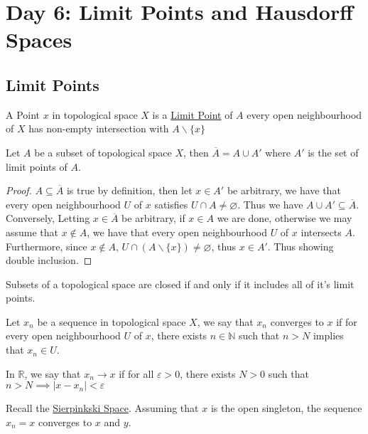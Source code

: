 \section{Day 6: Limit Points and Hausdorff Spaces}
\subsection{Limit Points}
\begin{definition}
    A Point $x$ in topological space $X$ is a \href{https://en.wikipedia.org/wiki/Accumulation_point}{Limit Point} of $A$ every open neighbourhood of $X$ has non-empty intersection with $A\backslash\{x\}$
\end{definition}
\begin{proposition}
    Let $A$ be a subset of topological space $X$, then $\overline{A} = A\cup A'$ where $A'$ is the set of limit points of $A$.
\end{proposition}
\begin{proof}
    $A\subseteq \overline{A}$ is true by definition, then let $x\in A'$ be arbitrary, we have that every open neighbourhood $U$ of $x$ satisfies $U\cap A\neq\varnothing$. Thus we have $A\cup A'\subseteq \overline{A}$. Conversely, Letting $x\in\overline{A}$ be arbitrary, if $x\in A$ we are done, otherwise we may assume that $x\not\in A$, we have that every open neighbourhood $U$ of $x$ intersects $A$. Furthermore, since $x\not\in A$, $U\cap(A\backslash\{x\})\neq\varnothing$, thus $x\in A'$. Thus showing double inclusion.
\end{proof}
\begin{corollary}
    Subsets of a topological space are closed if and only if it includes all of it's limit points.
\end{corollary}
\begin{definition}
    Let $x_n$ be a sequence in topological space $X$, we say that $x_n$ converges to $x$ if for every open neighbourhood $U$ of $x$, there exists $n\in\mathbb{N}$ such that $n>N$ implies that $x_n\in U$.
\end{definition}
\begin{example}
    In $\mathbb{R}$, we say that $x_n\to x$ if for all $\varepsilon>0$, there exists $N>0$ such that $n>N\implies\vert x-x_n\vert <\varepsilon$


\end{example}
\begin{example}
    Recall the \hyperlink{SierpinskiSpace}{Sierpinkski Space}. Assuming that $x$ is the open singleton, the sequence $x_n=x$ converges to $x$ and $y$.
\end{example}
